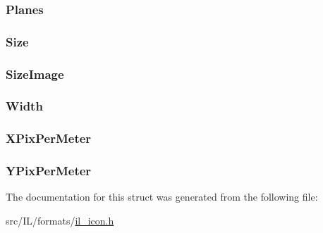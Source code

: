 \hypertarget{struct_i_n_f_o_h_e_a_d_ad6a16792bdb04dba10e5a46eb518ce65}{
\subsubsection[{Planes}]{ Planes}}\label{struct_i_n_f_o_h_e_a_d_ad6a16792bdb04dba10e5a46eb518ce65}
\hypertarget{struct_i_n_f_o_h_e_a_d_a79baeeee1ab272b95715f56b698506c7}{
\subsubsection[{Size}]{ Size}}\label{struct_i_n_f_o_h_e_a_d_a79baeeee1ab272b95715f56b698506c7}
\hypertarget{struct_i_n_f_o_h_e_a_d_a1fef46d6eb69aeffae54b289f8f8fe7f}{
\subsubsection[{Size\-Image}]{ Size\-Image}}\label{struct_i_n_f_o_h_e_a_d_a1fef46d6eb69aeffae54b289f8f8fe7f}
\hypertarget{struct_i_n_f_o_h_e_a_d_a0bebc214dbd5f199ad36aefd13feb6e7}{
\subsubsection[{Width}]{ Width}}\label{struct_i_n_f_o_h_e_a_d_a0bebc214dbd5f199ad36aefd13feb6e7}
\hypertarget{struct_i_n_f_o_h_e_a_d_a00d081344c18ea474ecc457f9ef2fb3f}{
\subsubsection[{X\-Pix\-Per\-Meter}]{ X\-Pix\-Per\-Meter}}\label{struct_i_n_f_o_h_e_a_d_a00d081344c18ea474ecc457f9ef2fb3f}
\hypertarget{struct_i_n_f_o_h_e_a_d_af4179227d1a1482a7649ce415e1a9d4d}{
\subsubsection[{Y\-Pix\-Per\-Meter}]{ Y\-Pix\-Per\-Meter}}\label{struct_i_n_f_o_h_e_a_d_af4179227d1a1482a7649ce415e1a9d4d}


The documentation for this struct was generated from the following file\-:\begin{DoxyCompactItemize}
\item 
src/\-I\-L/formats/\hyperlink{il__icon_8h}{il\-\_\-icon.\-h}\end{DoxyCompactItemize}
